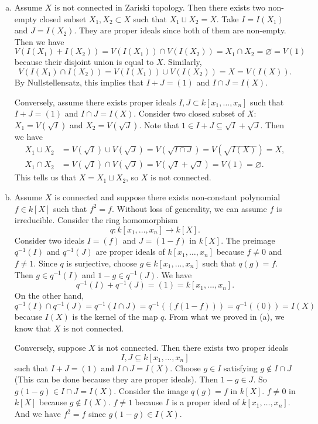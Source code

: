 \documentclass[letterpaper, 12pt]{article}
\begin{document}
\begin{solution}
\begin{enumerate}[(a)]
\item Assume \(X\) is not connected in Zariski topology. Then there exists two non-empty closed subset \(X_1,X_2\subset X\) such that \(X_1\sqcup X_2=X\). Take \(I=I(X_1)\) and \(J=I(X_2)\). They are proper ideals since both of them are non-empty. Then we have 
\[V(I(X_1)+I(X_2))=V(I(X_1))\cap V(I(X_2))=X_1\cap X_2=\varnothing=V(1)\]
because their disjoint union is equal to \(X\). Similarly, 
\[V(I(X_1)\cap I(X_2))=V(I(X_1))\cup V(I(X_2))=X=V(I(X)).\]
By Nullstellensatz, this implies that \(I+J=(1)\) and \(I\cap J=I(X)\). 

Conversely, assume there exists proper ideals \(I,J\subset k[x_1,\ldots,x_n]\) such that \(I+J=(1)\) and \(I\cap J=I(X)\). Consider two closed subset of \(X\): \(X_1=V(\sqrt{I})\) and \(X_2=V(\sqrt{J})\). Note that \(1\in I+J\subseteq \sqrt{I}+\sqrt{J}\). Then we have 
\begin{align*}
    X_1\cup X_2&=V(\sqrt{I})\cup V(\sqrt{J})=V(\sqrt{I\cap J})=V(\sqrt{I(X)})=X,\\ 
    X_1\cap X_2&=V(\sqrt{I})\cap V(\sqrt{J})=V(\sqrt{I}+\sqrt{J})=V(1)=\varnothing.
\end{align*}
This tells us that \(X=X_1\sqcup X_2\), so \(X\) is not connected.
\item Assume \(X\) is connected and suppose there exists non-constant polynomial \(f\in k[X]\) such that \(f^2=f\). Without loss of generality, we can assume \(f\) is irreducible. Consider the ring homomorphism
\[q:k[x_1,\ldots,x_n]\rightarrow k[X].\]
Consider two ideals \(I=(f)\) and \(J=(1-f)\) in \(k[X]\). The preimage \(q^{-1}(I)\) and \(q^{-1}(J)\) are proper ideals of \(k[x_1,\ldots,x_n]\) because \(f\neq 0\) and \(f\neq 1\). Since \(q\) is surjective, choose \(g\in k[x_1,\ldots,x_n]\) such that \(q(g)=f\). Then \(g\in q^{-1}(I)\) and \(1-g\in q^{-1}(J)\). We have 
\[q^{-1}(I)+q^{-1}(J)=(1)=k[x_1,\ldots,x_n].\]
On the other hand, 
\[q^{-1}(I)\cap q^{-1}(J)=q^{-1}(I\cap J)=q^{-1}((f(1-f)))=q^{-1}((0))=I(X)\]
because \(I(X)\) is the kernel of the map \(q\). From what we proved in (a), we know that \(X\) is not connected. 

Conversely, suppose \(X\) is not connected. Then there exists two proper ideals 
\[I,J\subseteq k[x_1,\ldots,x_n]\] 
such that \(I+J=(1)\) and \(I\cap J=I(X)\). Choose \(g\in I\) satisfying \(g\notin I\cap J\) (This can be done because they are proper ideals). Then \(1-g\in J\). So \(g(1-g)\in I\cap J=I(X)\). Consider the image \(q(g)=f\) in \(k[X]\). \(f\neq 0\) in \(k[X]\) because \(g\notin I(X)\). \(f\neq 1\) because \(I\) is a proper ideal of \(k[x_1,\ldots,x_n]\). And we have \(f^2=f\) since \(g(1-g)\in I(X)\). 
\end{enumerate}
\end{solution}
\end{document}
